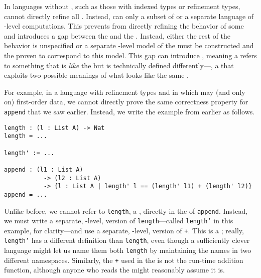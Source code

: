 In languages without  , such as those
with indexed types or refinement types,  cannot directly refine all
.
Instead,  can only  a subset of  or a
separate language of -level computations.
This prevents  from directly refining the behavior of some
 and introduces a gap between the  and the
.
Instead, either the rest of the behavior is unspecified or a separate
-level model of the  must be
constructed and the  proven to correspond to this model.
This gap can introduce , meaning a  refers to something
that is \emph{like} the  but is technically defined
differently---\ie, a  that exploits two possible meanings of
what looks like the same .

For example, in a language with refinement types and 
in which  may  (and only on) first-order data, we
cannot directly prove the same correctness property for
\texttt{append} that we saw earlier.
Instead, we write the example from earlier as follows.
\begin{verbatim}
length : (l : List A) -> Nat
length = ...

length' := ...

append : (l1 : List A)
           -> (l2 : List A)
           -> {l : List A | length' l == (length' l1) + (length' l2)}
append = ...
\end{verbatim}
Unlike before, we cannot refer to \texttt{length}, a ,
directly in the  of \texttt{append}.
Instead, we must write a separate, -level, version of
\texttt{length}---called \texttt{length'} in this example,
for clarity---and use a separate, -level, version of
\texttt{+}.
This is a ; really, \texttt{length'} has a different
definition than \texttt{length}, even though a sufficiently clever
language might let us name them both \texttt{length} by maintaining the
names in two different namespaces.
Similarly, the \texttt{+} used in the  is not the run-time
addition function, although anyone who reads the  might
reasonably assume it is.

